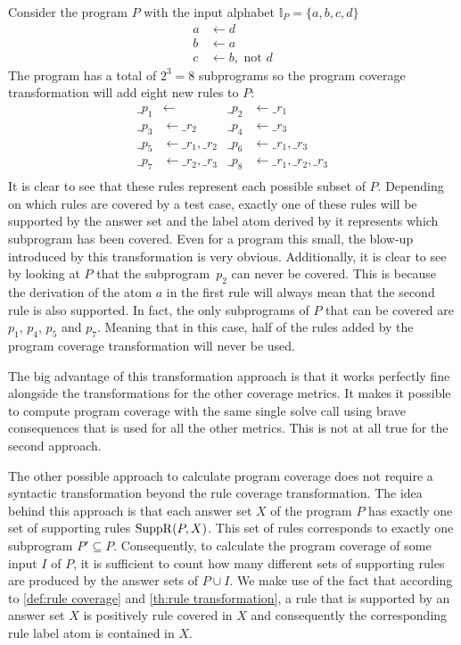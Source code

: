 \begin{example}
\label{ex:program transformation}
    Consider the program $P$ with the input alphabet \(\mathbb{I}_P = \{a, b, c, d\}\)
    \begin{align*}
        a &\leftarrow d \\
        b &\leftarrow a \\
        c &\leftarrow b, \text{ not } d
    \end{align*}
    The program has a total of \(2^3 = 8\) subprograms so the program coverage transformation will add eight new rules to $P$:
    \begin{align*}
        \_p_1 &\leftarrow              &   \_p_2 &\leftarrow \_r_1 \\
        \_p_3 &\leftarrow \_r_2        &   \_p_4 &\leftarrow \_r_3 \\
        \_p_5 &\leftarrow \_r_1, \_r_2 &   \_p_6 &\leftarrow \_r_1, \_r_3 \\
        \_p_7 &\leftarrow \_r_2, \_r_3 &   \_p_8 &\leftarrow \_r_1, \_r_2, \_r_3 \\
    \end{align*}
    It is clear to see that these rules represent each possible subset of $P$. Depending on which rules are covered by a test case, exactly one of these rules will be supported by the answer set and the label atom derived by it represents which subprogram has been covered. Even for a program this small, the blow-up introduced by this transformation is very obvious. Additionally, it is clear to see by looking at $P$ that the subprogram~$p_2$ can never be covered. This is because the derivation of the atom $a$ in the first rule will always mean that the second rule is also supported. In fact, the only subprograms of $P$ that can be covered are $p_1$, $p_4$, $p_5$ and $p_7$. Meaning that in this case, half of the rules added by the program coverage transformation will never be used.
\end{example}

The big advantage of this transformation approach is that it works perfectly fine alongside the transformations for the other coverage metrics. It makes it possible to compute program coverage with the same single solve call using brave consequences that is used for all the other metrics. This is not at all true for the second approach.

The other possible approach to calculate program coverage does not require a syntactic transformation beyond the rule coverage transformation. The idea behind this approach is that each answer set $X$ of the program $P$ has exactly one set of supporting rules \(\operatorname{SuppR}(P, X)\). This set of rules corresponds to exactly one subprogram \(P' \subseteq P\). Consequently, to calculate the program coverage of some input $I$ of $P$, it is sufficient to count how many different sets of supporting rules are produced by the answer sets of $P \cup I$. We make use of the fact that according to \cref{def:rule coverage} and \cref{th:rule transformation}, a rule that is supported by an answer set $X$ is positively rule covered in $X$ and consequently the corresponding rule label atom is contained in $X$.

